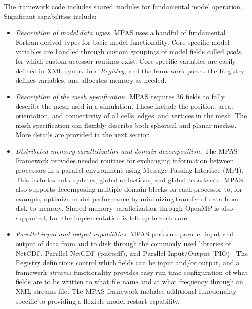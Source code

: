 The framework code includes shared modules for fundamental model operation.  Significant capabilities include:
\begin{itemize}

\item \textit{Description of model data types.}  MPAS uses a handful of fundamental Fortran derived types for basic model functionality.  Core-specific model variables are handled through custom groupings of model fields called \emph{pools}, for which custom accessor routines exist.  Core-specific variables are easily defined in XML syntax in a \emph{Registry}, and the framework parses the Registry, defines variables, and allocates memory as needed.

\item \textit{Description of the mesh specification.}  MPAS requires 36 fields to fully describe the mesh used in a simulation.  These include the position, area, orientation, and connectivity of all cells, edges, and vertices in the mesh.  The mesh specification can flexibly describe both spherical and planar meshes.  More details are provided in the next section.

\item \textit{Distributed memory parallelization and domain decomposition.}  The MPAS Framework provides needed routines for exchanging information between processors in a parallel environment using Message Passing Interface (MPI).  This includes halo updates, global reductions, and global broadcasts.  MPAS also supports decomposing multiple domain blocks on each processor to, for example, optimize model performance by minimizing transfer of data from disk to memory.  Shared memory parallelization through OpenMP is also supported, but the implementation is left up to each core.

\item \textit{Parallel input and output capabilities.}  MPAS performs parallel input and output of data from and to disk through the commonly used libraries of NetCDF, Parallel NetCDF (pnetcdf), and Parallel Input/Output (PIO) \citep{Dennis2012}.  The Registry definitions control which fields can be input and/or output, and a framework \emph{streams} functionality provides easy run-time configuration of what fields are to be written to what file name and at what frequency through an XML streams file. The MPAS framework includes additional functionality specific to providing a flexible model restart capability.


\end{itemize}
